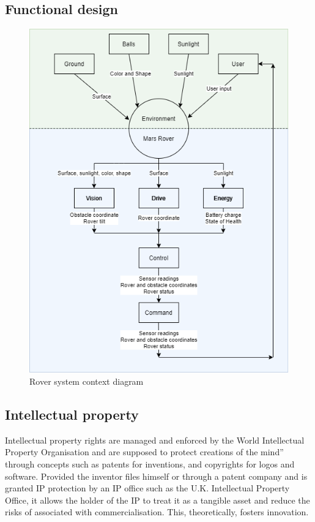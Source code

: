 \documentclass[11pt, a4paper]{article}
\begin{document}
\subsection{Functional design} 

\begin{figure} [h!]
    \centering
    \includegraphics[scale=0.6]{Rover functional.png}
    \caption{Rover system context diagram}
\end{figure}


\pagebreak
\subsection{Intellectual property}

Intellectual property rights are managed and enforced by the World Intellectual Property Organisation and are supposed to protect creations of the mind” through concepts such as patents for inventions, and copyrights for logos and software. Provided the inventor files himself or through a patent company and is granted IP protection by an IP office such as the U.K. Intellectual Property Office, it allows the holder of the IP to treat it as a tangible asset and reduce the risks of associated with commercialisation. This, theoretically, fosters innovation.
\end{document}
